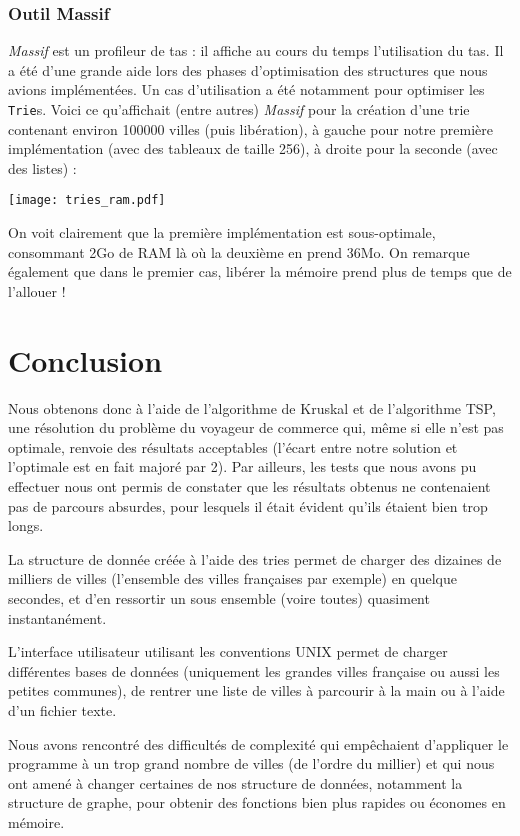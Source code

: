 \documentclass[a4paper]{article}
\begin{document}
\subsubsection{Outil Massif}
\emph{Massif} est un profileur de tas : il affiche au cours du temps l'utilisation du tas. Il a été d'une grande aide lors des phases d'optimisation des structures que nous avions implémentées. Un cas d'utilisation a été notamment pour optimiser les \texttt{Trie}s. Voici ce qu'affichait (entre autres) \emph{Massif} pour la création d'une trie contenant environ 100000 villes (puis libération), à gauche pour notre première implémentation (avec des tableaux de taille 256), à droite pour la seconde (avec des listes) :

\medskip

\texttt{[image: tries\_ram.pdf]}

On voit clairement que la première implémentation est sous-optimale, consommant 2Go de RAM là où la deuxième en prend 36Mo. On remarque également que dans le premier cas, libérer la mémoire prend plus de temps que de l'allouer !

\section*{Conclusion}

Nous obtenons donc à l'aide de l'algorithme de {\sc Kruskal} et de l'algorithme TSP, une résolution du problème du voyageur de commerce qui, même si elle n'est pas optimale, renvoie des résultats acceptables (l'écart entre notre solution et l'optimale est en fait majoré par 2). Par ailleurs, les tests que nous avons pu effectuer nous ont permis de constater que les résultats obtenus ne contenaient pas de parcours absurdes, pour lesquels il était évident qu'ils étaient bien trop longs.

La structure de donnée créée à l'aide des tries permet de charger des dizaines de milliers de villes (l'ensemble des villes françaises par exemple) en quelque secondes, et d'en ressortir un sous ensemble (voire toutes) quasiment instantanément.

L'interface utilisateur utilisant les conventions UNIX permet de charger différentes bases de données (uniquement les grandes villes française ou aussi les petites communes), de rentrer une liste de villes à parcourir à la main ou à l'aide d'un fichier texte.

Nous avons rencontré des difficultés de complexité qui empêchaient d'appliquer le programme à un trop grand nombre de villes (de l'ordre du millier) et qui nous ont amené à changer certaines de nos structure de données, notamment la structure de graphe, pour obtenir des fonctions bien plus rapides ou économes en mémoire.
\end{document}
